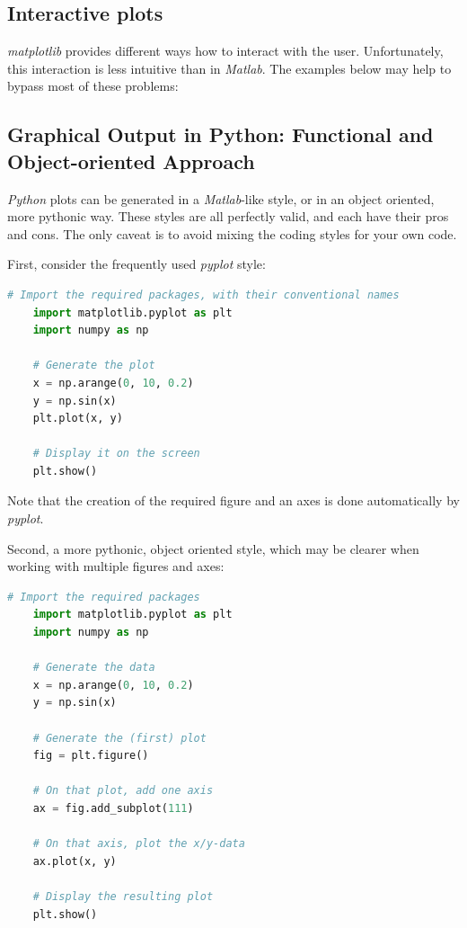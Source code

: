 \subsection{Interactive plots}

\emph{matplotlib} provides different ways how to interact with the user. Unfortunately, this interaction is less intuitive than in \emph{Matlab}. The examples below may help to bypass most of these problems:




\subsection{Graphical Output in Python: Functional and Object-oriented Approach}

\emph{Python} plots can be generated in a \emph{Matlab}-like style, or in an object oriented, more pythonic way. These styles are all perfectly valid, and each have their pros and cons. The only caveat is to avoid mixing the coding styles for your own code.

First, consider the frequently used \emph{pyplot} style:

\begin{lstlisting}[language=Python]
    # Import the required packages, with their conventional names
    import matplotlib.pyplot as plt
    import numpy as np

    # Generate the plot
    x = np.arange(0, 10, 0.2)
    y = np.sin(x)
    plt.plot(x, y)

    # Display it on the screen
    plt.show()
\end{lstlisting}

Note that the creation of the required figure and an axes is done automatically by \emph{pyplot}.

Second, a more pythonic, object oriented style, which may be clearer when working with multiple figures and axes:

\begin{lstlisting}[language=Python]
    # Import the required packages
    import matplotlib.pyplot as plt
    import numpy as np

    # Generate the data
    x = np.arange(0, 10, 0.2)
    y = np.sin(x)

    # Generate the (first) plot
    fig = plt.figure()

    # On that plot, add one axis
    ax = fig.add_subplot(111)

    # On that axis, plot the x/y-data
    ax.plot(x, y)

    # Display the resulting plot
    plt.show()
\end{lstlisting}

